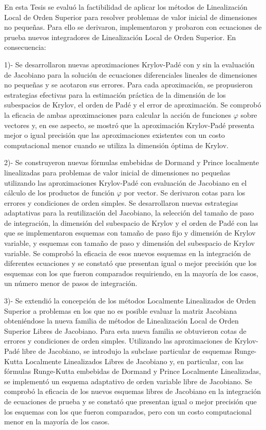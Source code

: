 \begin{conclusions}
	
	En esta Tesis se evaluó la factibilidad de aplicar los métodos de Linealización Local de Orden Superior para resolver problemas de valor inicial de dimensiones no pequeñas. Para ello se derivaron, implementaron y probaron con ecuaciones de prueba nuevos integradores de Linealización Local de Orden Superior. En consecuencia:
	
	1)- Se desarrollaron nuevas aproximaciones Krylov-Padé con y sin la evaluación de Jacobiano para la solución de ecuaciones diferenciales lineales de dimensiones no pequeñas y se acotaron sus errores.
	Para cada aproximación, se propusieron estrategias efectivas para la estimación práctica de la dimensión de los subespacios de Krylov, el orden de Padé y el error de aproximación. Se comprobó la eficacia de
	ambas aproximaciones para calcular la acción de funciones $\varphi$ sobre vectores y, en ese aspecto, se 	mostró que la aproximación Krylov-Padé 
	presenta mejor o igual precisión que las aproximaciones existentes con un costo computacional menor cuando se utiliza la dimensión óptima de Krylov.
	
	2)- Se construyeron nuevas fórmulas embebidas de Dormand y Prince localmente linealizadas para problemas de valor inicial de dimensiones no pequeñas utilizando las aproximaciones Krylov-Padé
	con evaluación de Jacobiano en el cálculo de los productos de función $\varphi$ por vector. Se derivaron cotas para los errores y condiciones de orden simples. Se desarrollaron nuevas estrategias adaptativas para la reutilización del Jacobiano, la selección del tamaño de paso de integración, la dimensión del subespacio de Krylov
	y el orden de Padé con las que se implementaron esquemas con tamaño de paso fijo y dimensión 	de Krylov variable, y esquemas con tamaño de paso y dimensión del subespacio de Krylov variable. Se comprobó
	la eficacia de esos nuevos esquemas en la integración de diferentes ecuaciones y se constató que presentan igual o mejor precisión que los esquemas con los que fueron comparados requiriendo, en
	la mayoría de los casos, un número menor de pasos de integración.
	
	3)- Se extendió la concepción de los métodos Localmente Linealizados de Orden Superior a problemas en los que no es posible evaluar la matriz Jacobiana obteniéndose la nueva familia de métodos
	de Linealización Local de Orden Superior Libres de Jacobiano. Para esta nueva familia se obtuvieron cotas de errores y condiciones de orden simples. Utilizando las aproximaciones de Krylov-Padé libre
	de Jacobiano, se introdujo la subclase particular de esquemas Runge-Kutta Localmente Linealizados Libres de Jacobiano y, en particular, con las fórmulas Runge-Kutta embebidas de Dormand y
	Prince Localmente Linealizadas, se implementó un esquema adaptativo de orden variable libre de Jacobiano. Se comprobó la eficacia de los nuevos esquemas libres de Jacobiano en la integración de
	ecuaciones de prueba y se constató que presentan igual o mejor precisión que los esquemas con los que fueron comparados, pero con un costo computacional menor en la mayoría de los casos.
	

\end{conclusions}
